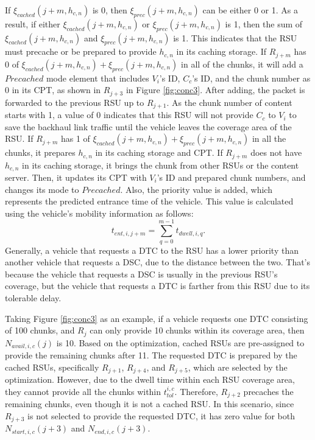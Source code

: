 \documentclass[journal]{IEEEtran}
\begin{document}
If $\xi_{cached}(j+m,h_{c,n})$ is 0, then $\xi_{prec}(j+m,h_{c,n})$ can be either 0 or 1.
As a result, if either $\xi_{cached}(j+m,h_{c,n})$ or $\xi_{prec}(j+m,h_{c,n})$ is 1, then the sum of $\xi_{cached}(j+m,h_{c,n})$ and $\xi_{prec}(j+m,h_{c,n})$ is 1.
This indicates that the RSU must precache or be prepared to provide $h_{c,n}$ in its caching storage.
If $R_{j+m}$ has 0 of $\xi_{cached}(j+m,h_{c,n}) + \xi_{prec}(j+m,h_{c,n})$ in all of the chunks, it will add a $Precached$ mode element that includes $V_{i}$'s ID, $C_{c}$'s ID, and the chunk number as 0 in its CPT, as shown in $R_{j+3}$ in Figure \ref{fig:conc3}.
After adding, the packet is forwarded to the previous RSU up to $R_{j+1}$.
As the chunk number of content starts with 1, a value of 0 indicates that this RSU will not provide $C_{c}$ to $V_{i}$ to save the backhaul link traffic until the vehicle leaves the coverage area of the RSU.
If $R_{j+m}$ has 1 of $\xi_{cached}(j+m,h_{c,n}) + \xi_{prec}(j+m,h_{c,n})$ in all the chunks, it prepares $h_{c,n}$ in its caching storage and CPT.
If $R_{j+m}$ does not have $h_{c,n}$ in its caching storage, it brings the chunk from other RSUs or the content server.
Then, it updates its CPT with $V_{i}$'s ID and prepared chunk numbers, and changes its mode to $Precached$.
Also, the priority value is added, which represents the predicted entrance time of the vehicle.
This value is calculated using the vehicle's mobility information as follows:
\begin{equation}
    t_{ent, i, j+m} = \sum^{m-1}_{q=0} t_{dwell,i,q}.
\end{equation}
Generally, a vehicle that requests a DTC to the RSU has a lower priority than another vehicle that requests a DSC, due to the distance between the two.
That's because the vehicle that requests a DSC is usually in the previous RSU's coverage, but the vehicle that requests a DTC is farther from this RSU due to its tolerable delay.

Taking Figure \ref{fig:conc3} as an example, if a vehicle requests one DTC consisting of 100 chunks, and $R_{j}$ can only provide 10 chunks within its coverage area, then $N_{avail,i,c}(j)$ is 10.
Based on the optimization, cached RSUs are pre-assigned to provide the remaining chunks after 11.
The requested DTC is prepared by the cached RSUs, specifically $R_{j+1}$, $R_{j+4}$, and $R_{j+5}$, which are selected by the optimization.
However, due to the dwell time within each RSU coverage area, they cannot provide all the chunks within $t_{tol}^{i,c}$.
Therefore, $R_{j+2}$ precaches the remaining chunks, even though it is not a cached RSU.
In this scenario, since $R_{j+3}$ is not selected to provide the requested DTC, it has zero value for both $N_{start,i,c}(j+3)$ and $N_{end,i,c}(j+3)$.
\end{document}
